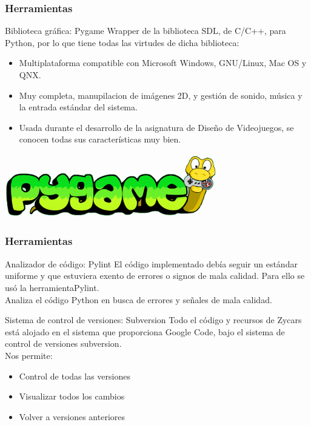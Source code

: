 \begin{frame}
    \frametitle{Herramientas}

        \begin{block}{Biblioteca gráfica: Pygame}
        Wrapper de la biblioteca SDL, de C/C++, para Python, por lo que tiene todas las virtudes de dicha biblioteca:
            \begin{itemize}
                \item Multiplataforma compatible con Microsoft Windows, GNU/Linux, Mac OS y QNX.
                \item Muy completa, manupilacion de imágenes 2D, y gestión de sonido, música y la entrada estándar del sistema.
                \item Usada durante el desarrollo de la asignatura de Diseño de Videojuegos, se conocen todas sus 
                características muy bien.
            \end{itemize}
        \end{block}
        
        \begin{center}
                \includegraphics[scale=0.4]{imagenes/logo_pygame.png}
        \end{center}
\end{frame}

\begin{frame}
    \frametitle{Herramientas}

        \begin{block}{Analizador de código: Pylint}
        El código implementado debía seguir un estándar uniforme y que estuviera exento de errores o signos 
        de mala calidad. Para ello se usó la herramientaPylint.\\
        Analiza el código Python en busca de errores y señales de mala calidad.
        \end{block}

        \begin{block}{Sistema de control de versiones: Subversion}
        Todo el código y recursos de Zycars está alojado en el sistema que proporciona Google Code, bajo
        el sistema de control de versiones subversion.\\
        Nos permite: 
            \begin{itemize}
                \item Control de todas las versiones
                \item Visualizar todos los cambios
                \item Volver a versiones anteriores
            \end{itemize}
        \end{block}

\end{frame}



